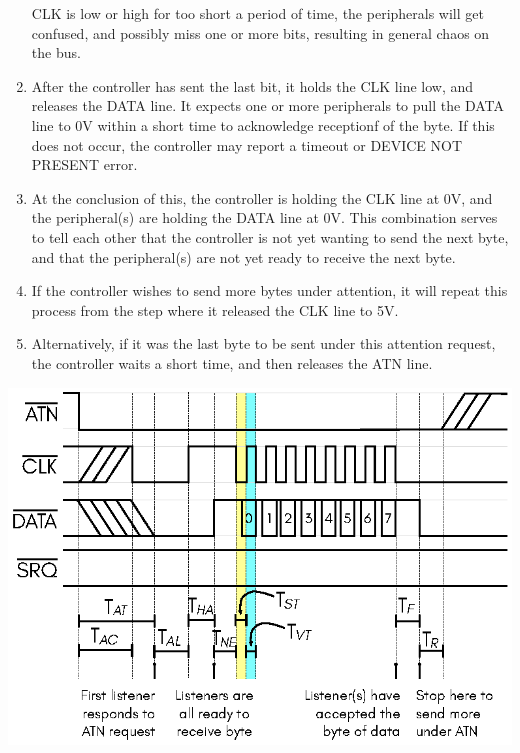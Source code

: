 \begin{enumerate}
  CLK is low or high for too short a period of time, the peripherals
  will get confused, and possibly miss one or more bits, resulting
  in general chaos on the bus.
\item After the controller has sent the last bit, it holds the CLK
  line low, and releases the DATA line. It expects one or more
  peripherals to pull the DATA line to 0V within a short time to
  acknowledge receptionf of the byte. If this does not occur, the
  controller may report a timeout or DEVICE NOT PRESENT error.
\item At the conclusion of this, the controller is holding the
  CLK line at 0V, and the peripheral(s) are holding the DATA
  line at 0V. This combination serves to tell each other that
  the controller is not yet wanting to send the next byte, and
  that the peripheral(s) are not yet ready to receive the next
  byte.
\item If the controller wishes to send more bytes under
  attention, it will repeat this process from the step where
  it released the CLK line to 5V.
\item Alternatively, if it was the last byte to be sent
  under this attention request, the controller waits a short
  time, and then releases the ATN line.
\end{enumerate}

\begin{center}
\includegraphics{images/IEC-Timing-Diagrams/IEC-Timing-Diagram-ATN-Send-Byte}
\end{center}


